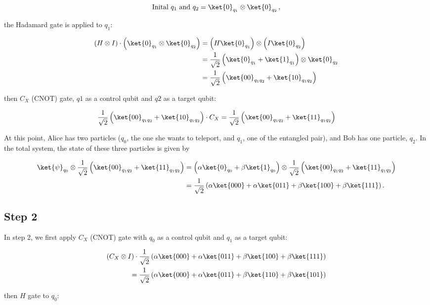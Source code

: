 \documentclass[10pt,a4paper]{article}
\newcommand{\<}{\langle}
\renewcommand{\>}{\rangle}
\newcommand{\prths}[1]{\left( #1 \right)}
\begin{document}
$$
\textrm{Inital $q_1$ and $q_2$} = \ket{0}_{q_1} \otimes \ket{0}_{q_2} \, ,
$$

the Hadamard gate is applied to $q_1$:

\begin{align*}
\prths{
H \otimes I
} \cdot \prths {
\ket{0}_{q_1} \otimes \ket{0}_{q_2}
} & =
\prths {H \ket{0}_{q_1}} \otimes
\prths {I \ket{0}_{q_2}} \\ & =
\frac{1}{\sqrt{2}}
\prths {\ket{0}_{q_1} + \ket{1}_{q_1}} \otimes
\ket{0}_{q_2} \\ & =
\frac{1}{\sqrt{2}}
\prths {\ket{00}_{q_1q_2} + \ket{10}_{q_1q_2}}
\end{align*}

then $C_X$ (CNOT) gate, $q1$ as a control qubit and $q2$ as a target qubit:

$$
\frac{1}{\sqrt{2}}
\prths {\ket{00}_{q_1q_2} + \ket{10}_{q_1q_2}} \cdot C_X =
\frac{1}{\sqrt{2}}
\prths {\ket{00}_{q_1q_2} + \ket{11}_{q_1q_2}}
$$

At this point, Alice has two particles ($q_0$, the one she wants to teleport, and $q_1$, one of the
entangled pair), and Bob has one particle, $q_2$. In the total system, the state of these three
particles is given by

\begin{align*}
\ket{\psi}_{q_0} \otimes
\frac{1}{\sqrt{2}}
\prths {\ket{00}_{q_1q_2} + \ket{11}_{q_1q_2}} & =
\prths {\alpha \ket{0}_{q_0} + \beta \ket{1}_{q_0}} \otimes
\frac{1}{\sqrt{2}}
\prths {\ket{00}_{q_1q_2} + \ket{11}_{q_1q_2}} \\ & =
\frac{1}{\sqrt{2}}
\prths {
\alpha \ket{000}+
\alpha \ket{011}+
\beta \ket{100}+
\beta \ket{111}
}.
\end{align*}

\subsection{Step 2}

In step 2, we first apply $C_X$ (CNOT) gate with $q_0$ as a control qubit and $q_1$ as a target qubit:

\begin{align*}
\prths{C_X \otimes I } \cdot
\frac{1}{\sqrt{2}}
\prths {
\alpha \ket{000}+
\alpha \ket{011}+
\beta \ket{100}+
\beta \ket{111}
} \\ =
\frac{1}{\sqrt{2}}
\prths {
\alpha \ket{000}+
\alpha \ket{011}+
\beta \ket{110}+
\beta \ket{101}
}
\end{align*}

then $H$ gate to $q_0$:
\end{document}
